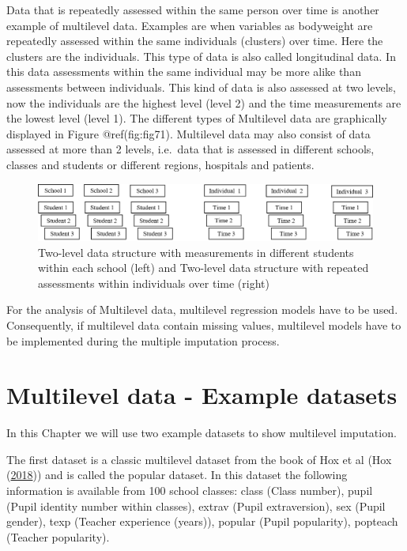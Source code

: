 \documentclass[
]{book}
\begin{document}
Data that is repeatedly assessed within the same person over time is
another example of multilevel data. Examples are when variables as
bodyweight are repeatedly assessed within the same individuals
(clusters) over time. Here the clusters are the individuals. This type
of data is also called longitudinal data. In this data assessments
within the same individual may be more alike than assessments between
individuals. This kind of data is also assessed at two levels, now the
individuals are the highest level (level 2) and the time measurements
are the lowest level (level 1). The different types of Multilevel data
are graphically displayed in Figure @ref(fig:fig71). Multilevel data may
also consist of data assessed at more than 2 levels, i.e.~data that is
assessed in different schools, classes and students or different
regions, hospitals and patients.

\begin{figure}

{\centering \includegraphics[width=0.9\linewidth]{images/fig7.1} 

}

\caption{Two-level data structure with measurements in different students within each school (left) and Two-level data structure with repeated assessments within individuals over time (right)}\label{fig:fig71}
\end{figure}

For the analysis of Multilevel data, multilevel regression models have
to be used. Consequently, if multilevel data contain missing values,
multilevel models have to be implemented during the multiple imputation
process.

\hypertarget{multilevel-data---example-datasets}{%
\section{Multilevel data - Example
datasets}\label{multilevel-data---example-datasets}}

In this Chapter we will use two example datasets to show multilevel
imputation.

The first dataset is a classic multilevel dataset from the book of Hox
et al (Hox (\protect\hyperlink{ref-hox2018multilevelanalysis}{2018}))
and is called the popular dataset. In this dataset the following
information is available from 100 school classes: class (Class number),
pupil (Pupil identity number within classes), extrav (Pupil
extraversion), sex (Pupil gender), texp (Teacher experience (years)),
popular (Pupil popularity), popteach (Teacher popularity).
\end{document}
